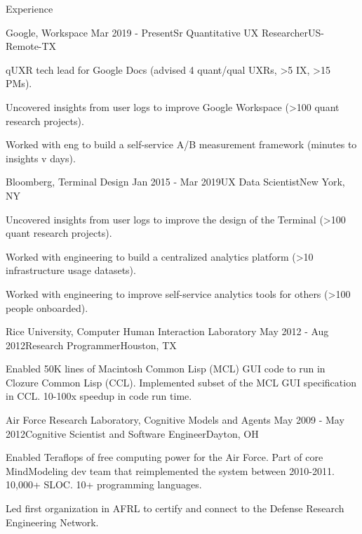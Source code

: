 
\begin{rSection}{Experience}

  \begin{rSubsection}{Google, Workspace}
    {Mar 2019 - Present}{Sr Quantitative UX Researcher}{US-Remote-TX}
  \item qUXR tech lead for Google Docs (advised 4 quant/qual UXRs, \textgreater5 IX, \textgreater15 PMs).
  \item Uncovered insights from user logs to improve Google Workspace (\textgreater100 quant research projects).
  \item Worked with eng to build a self-service A/B measurement framework (minutes to insights v days).
  \end{rSubsection}

  \begin{rSubsection}{Bloomberg, Terminal Design}
    {Jan 2015 - Mar 2019}{UX Data Scientist}{New York, NY}
    \item Uncovered insights from user logs to improve the design of the Terminal (\textgreater100 quant research projects).
    \item Worked with engineering to build a centralized analytics platform (\textgreater10 infrastructure usage datasets).
    \item Worked with engineering to improve self-service analytics tools for others (\textgreater100 people onboarded). 
  \end{rSubsection}

  \begin{rSubsection}{Rice University, Computer Human Interaction Laboratory}
    {May 2012 - Aug 2012}{Research Programmer}{Houston, TX}
  \item Enabled 50K lines of Macintosh Common Lisp (MCL) GUI code to run in Clozure Common Lisp (CCL).
    Implemented subset of the MCL GUI specification in CCL. 10-100x speedup in code run time. 
  \end{rSubsection}

  \begin{rSubsection}{Air Force Research Laboratory, Cognitive Models and Agents}
    {May 2009 - May 2012}{Cognitive Scientist and Software Engineer}{Dayton, OH}
  \item 
    Enabled Teraflops of free computing power for the Air Force.
    Part of core MindModeling dev team that reimplemented the system between 2010-2011.
    10,000+ SLOC. 10+ programming languages. 
  \item
    Led first organization in AFRL to certify and connect to the Defense Research Engineering Network.
  \end{rSubsection}


\end{rSection}
